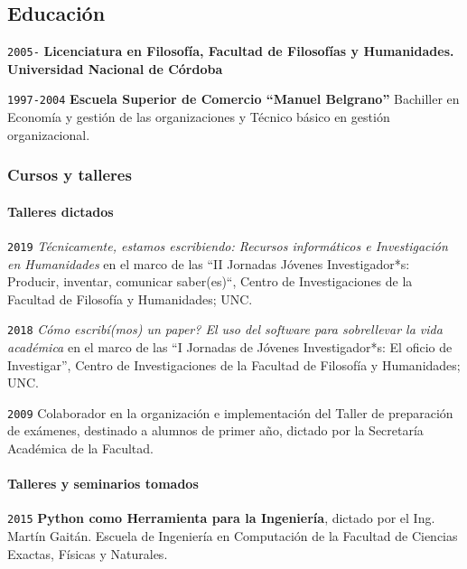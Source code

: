 \documentclass[]{article}
\let\oldparagraph\paragraph
\renewcommand{\paragraph}[1]{\oldparagraph{#1}\mbox{}}
\begin{document}
\hypertarget{educaciuxf3n}{%
\subsection{Educación}\label{educaciuxf3n}}

\texttt{2005-} \textbf{Licenciatura en Filosofía, Facultad de Filosofías
y Humanidades. Universidad Nacional de Córdoba}

\texttt{1997-2004} \textbf{Escuela Superior de Comercio ``Manuel
Belgrano''} Bachiller en Economía y gestión de las organizaciones y
Técnico básico en gestión organizacional.

\hypertarget{cursos-y-talleres}{%
\subsubsection{Cursos y talleres}\label{cursos-y-talleres}}

\hypertarget{talleres-dictados}{%
\paragraph{Talleres dictados}\label{talleres-dictados}}

\texttt{2019} \emph{Técnicamente, estamos escribiendo: Recursos
informáticos e Investigación en Humanidades} en el marco de las ``II
Jornadas Jóvenes Investigador*s: Producir, inventar, comunicar
saber(es)``, Centro de Investigaciones de la Facultad de Filosofía y
Humanidades; UNC.

\texttt{2018} \emph{Cómo escribí(mos) un paper? El uso del software para
sobrellevar la vida académica} en el marco de las ``I Jornadas de
Jóvenes Investigador*s: El oficio de Investigar'', Centro de
Investigaciones de la Facultad de Filosofía y Humanidades; UNC.

\texttt{2009} Colaborador en la organización e implementación del Taller
de preparación de exámenes, destinado a alumnos de primer año, dictado
por la Secretaría Académica de la Facultad.

\hypertarget{talleres-y-seminarios-tomados}{%
\paragraph{Talleres y seminarios
tomados}\label{talleres-y-seminarios-tomados}}

\texttt{2015} \textbf{Python como Herramienta para la Ingeniería},
dictado por el Ing. Martín Gaitán. Escuela de Ingeniería en Computación
de la Facultad de Ciencias Exactas, Físicas y Naturales.
\end{document}
